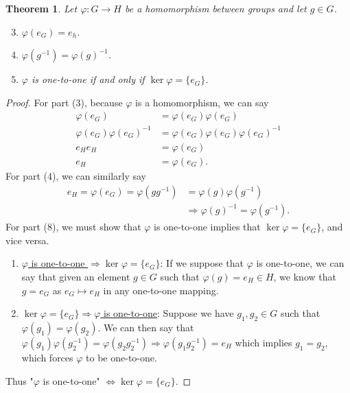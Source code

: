 \documentclass[12pt]{article}
\newtheorem{thm}{Theorem}
\numberwithin{problem}{section} %
\numberwithin{defn}{section} %
\numberwithin{thm}{section} %
\numberwithin{exer}{section} %
\numberwithin{lma}{section} %
\numberwithin{crlly}{section} %
\theoremstyle{remark}  %
\begin{document}
\begin{thm}
    Let $\varphi\operatorname{:} G \to H$ be a homomorphism between groups and let $g\in G$.
    \begin{enumerate}
        \setcounter{enumi}{2}
        \item $\varphi(e_G)=e_h$.
        \item $\varphi(g^{-1})=\varphi(g)^{-1}$.
        \item $\varphi$ is one-to-one if and only if $\ker \varphi=\{e_G\}$.
    \end{enumerate}
\end{thm}
\begin{proof}
    For part (3), because $\varphi$ is a homomorphism, we can say \begin{align*}
        \varphi(e_G) &= \varphi(e_G)\varphi(e_G) \\
        \varphi(e_G)\varphi(e_G)^{-1} &= \varphi(e_G)\varphi(e_G)\varphi(e_G)^{-1} \\
        e_He_H &= \varphi(e_G) \\
        e_H &= \varphi(e_G).
    \end{align*}
    For part (4), we can similarly say
    \begin{align*}
        e_H = \varphi(e_G) = \varphi(gg^{-1}) &= \varphi(g)\varphi(g^{-1}) \\
        &\Rightarrow \varphi(g)^{-1} = \varphi(g^{-1}).
    \end{align*}
    For part (8), we must show that $\varphi$ is one-to-one implies that $\ker \varphi=\{e_G\}$, and vice versa.
    \begin{enumerate}
        \item \ul{$\varphi$ is one-to-one $\Rightarrow \ker \varphi = \{e_G\}$}: If we suppose that $\varphi$ is one-to-one, we can say that given an element $g\in G$ such that $\varphi(g)=e_H\in H$, we know that $g=e_G$ as $e_G\mapsto e_H$ in any one-to-one mapping.
        \item \ul{$\ker \varphi = \{e_G\}\Rightarrow \varphi$ is one-to-one}: Suppose we have $g_1,g_2\in G$ such that $\varphi(g_1)=\varphi(g_2)$. We can then say that $\varphi(g_1)\varphi(g_2^{-1})=\varphi(g_2g_2^{-1})\Rightarrow \varphi(g_1g_2^{-1}) = e_H$ which implies $g_1=g_2$, which forces $\varphi$ to be one-to-one.
    \end{enumerate}
    Thus "$\varphi$ is one-to-one" $\Leftrightarrow \ker \varphi = \{e_G\}$.
\end{proof}
\end{document}

